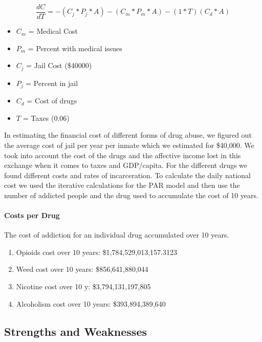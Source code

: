 \documentclass[12pt,letterpaper]{article}
\begin{document}
\begin{small}
\begin{singlespace}
\begin{equation}
\frac{dC}{dT} = -(C_j * P_j * A) - (C_m * P_m * A) - (1*T)(C_d * A)
\end{equation}
\begin{itemize}[label=]
\item $C_m$ = Medical Cost
\item $P_m$ = Percent with medical issues
\item $C_j$ = Jail Cost (\$40000)
\item $P_j$ = Percent in jail
\item $C_d$ = Cost of drugs
\item $T$ = Taxes (0.06)
\end{itemize}
\end{singlespace}
\end{small}

In estimating the financial cost of different forms of drug abuse, we figured out the average cost of jail per year per inmate which we estimated for \$40,000. We took into account the cost of the drugs and the affective income lost in this exchange when it comes to taxes and GDP/capita. For the different drugs we found different costs and rates of incarceration. To calculate the daily national cost we used the iterative calculations for the PAR model and then use the number of addicted people and the drug used to accumulate the cost of 10 years.

\paragraph{Costs per Drug}

The cost of addiction for an individual drug accumulated over 10 years.
\begin{enumerate}
\item Opioids cost over 10 years: \$1,784,529,013,157.3123
\item Weed cost over 10 years: \$856,641,880,044
\item Nicotine cost over 10 y: \$3,794,131,197,805
\item Alcoholism cost over 10 years: \$393,894,389,640
\end{enumerate}

\subsection{Strengths and Weaknesses}
\end{document}
